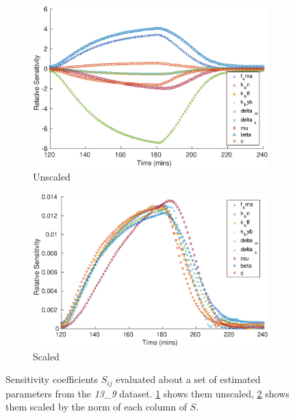 \documentclass[10pt,journal]{./IEEE_latex_class/IEEEtran}
\begin{document}
\begin{figure}[h]	
	\begin{subfigure}[h]{0.49\textwidth}
    \centering
        \includegraphics[scale = 0.35,clip = true, trim = 30 0 60 0]{Sensitivity_unscaled}
        \caption{Unscaled}
        \label{SensitivityMatrix_unscaled} 
    \end{subfigure}
    \begin{subfigure}[h]{0.49\textwidth}
    \centering
        \includegraphics[scale = 0.35,clip = true, trim = 15 0 60 0]{Sensitivity_scaled}
        \caption{Scaled}
                \label{SensitivityMatrix_scaled} 
    \end{subfigure}
    \caption{Sensitivity coefficients $S_{ij}$ evaluated about a set of estimated parameters from the \textit{13\_9} dataset. \ref{SensitivityMatrix_unscaled} shows them unscaled, \ref{SensitivityMatrix_scaled} shows them scaled by the norm of each column of $S$.} 
\label{SensitivityMatrix}   
\end{figure}
\end{document}

